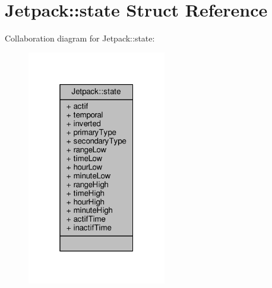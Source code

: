 \hypertarget{struct_jetpack_1_1state}{}\section{Jetpack\+:\+:state Struct Reference}
\label{struct_jetpack_1_1state}


Collaboration diagram for Jetpack\+:\+:state\+:\nopagebreak
\begin{figure}[H]
\begin{center}
\leavevmode
\includegraphics[width=172pt]{de/da1/struct_jetpack_1_1state__coll__graph}
\end{center}
\end{figure}
